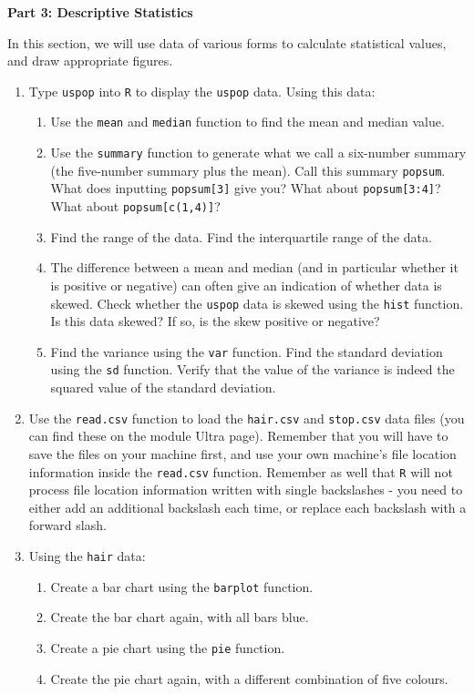 \documentclass[11pt,a4paper]{article}
\begin{document}
\vspace{0.2cm}

\textbf{Part 3: Descriptive Statistics} 

In this section, we will use data of various forms to calculate statistical values, and draw appropriate figures.

\begin{enumerate}

\item Type \texttt{uspop} into \texttt{R} to display the \texttt{uspop} data. Using this data:
\begin{enumerate}
\item Use the \texttt{mean} and \texttt{median} function to find the mean and median value.
\item Use the \texttt{summary} function to generate what we call a six-number summary (the five-number summary plus the mean). Call this summary \texttt{popsum}. What does inputting \texttt{popsum[3]} give you? What about \texttt{popsum[3:4]}? What about \texttt{popsum[c(1,4)]}?
\item Find the range of the data. Find the interquartile range of the data.
\item The difference between a mean and median (and in particular whether it is positive or negative) can often give an indication of whether data is skewed. Check whether the \texttt{uspop} data is skewed using the \texttt{hist} function. Is this data skewed? If so, is the skew positive or negative?
\item Find the variance using the \texttt{var} function. Find the standard deviation using the \texttt{sd} function. Verify that the value of the variance is indeed the squared value of the standard deviation.
\end{enumerate}

\item Use the \texttt{read.csv} function to load the \texttt{hair.csv} and \texttt{stop.csv} data files (you can find these on the module Ultra page). Remember that you will have to save the files on your machine first, and use your own machine's file location information inside the \texttt{read.csv} function. Remember as well that \texttt{R} will not process file location information written with single backslashes - you need to either add an additional backslash each time, or replace each backslash with a forward slash.


\item Using the \texttt{hair} data:
\begin{enumerate}
\item Create a bar chart using the \texttt{barplot} function.
\item Create the bar chart again, with all bars blue.
\item Create a pie chart using the \texttt{pie} function.
\item Create the pie chart again, with a different combination of five colours.
\end{enumerate}


\end{enumerate}
\end{document}
